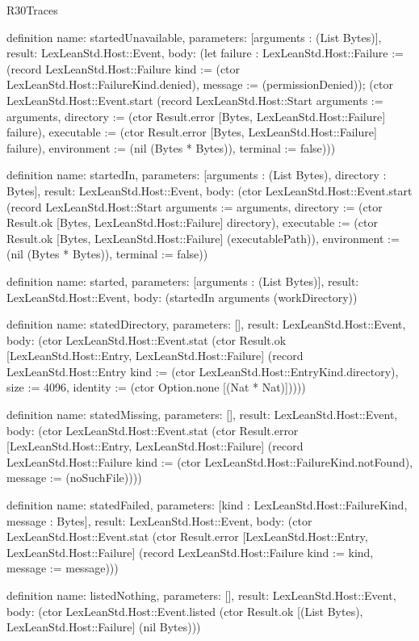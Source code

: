 \begin{lexlean}{R30Traces}
\begin{semanticmodule}
definition{
  name: startedUnavailable,
  parameters: [arguments : (List Bytes)],
  result: LexLeanStd.Host::Event,
  body: (let failure : LexLeanStd.Host::Failure := (record LexLeanStd.Host::Failure {kind := (ctor LexLeanStd.Host::FailureKind.denied), message := (permissionDenied)}); (ctor LexLeanStd.Host::Event.start (record LexLeanStd.Host::Start {arguments := arguments, directory := (ctor Result.error [Bytes, LexLeanStd.Host::Failure] failure), executable := (ctor Result.error [Bytes, LexLeanStd.Host::Failure] failure), environment := (nil (Bytes * Bytes)), terminal := false})))
}

definition{
  name: startedIn,
  parameters: [arguments : (List Bytes), directory : Bytes],
  result: LexLeanStd.Host::Event,
  body: (ctor LexLeanStd.Host::Event.start (record LexLeanStd.Host::Start {arguments := arguments, directory := (ctor Result.ok [Bytes, LexLeanStd.Host::Failure] directory), executable := (ctor Result.ok [Bytes, LexLeanStd.Host::Failure] (executablePath)), environment := (nil (Bytes * Bytes)), terminal := false}))
}

definition{
  name: started,
  parameters: [arguments : (List Bytes)],
  result: LexLeanStd.Host::Event,
  body: (startedIn arguments (workDirectory))
}

definition{
  name: statedDirectory,
  parameters: [],
  result: LexLeanStd.Host::Event,
  body: (ctor LexLeanStd.Host::Event.stat (ctor Result.ok [LexLeanStd.Host::Entry, LexLeanStd.Host::Failure] (record LexLeanStd.Host::Entry {kind := (ctor LexLeanStd.Host::EntryKind.directory), size := 4096, identity := (ctor Option.none [(Nat * Nat)])})))
}

definition{
  name: statedMissing,
  parameters: [],
  result: LexLeanStd.Host::Event,
  body: (ctor LexLeanStd.Host::Event.stat (ctor Result.error [LexLeanStd.Host::Entry, LexLeanStd.Host::Failure] (record LexLeanStd.Host::Failure {kind := (ctor LexLeanStd.Host::FailureKind.notFound), message := (noSuchFile)})))
}

definition{
  name: statedFailed,
  parameters: [kind : LexLeanStd.Host::FailureKind, message : Bytes],
  result: LexLeanStd.Host::Event,
  body: (ctor LexLeanStd.Host::Event.stat (ctor Result.error [LexLeanStd.Host::Entry, LexLeanStd.Host::Failure] (record LexLeanStd.Host::Failure {kind := kind, message := message})))
}

definition{
  name: listedNothing,
  parameters: [],
  result: LexLeanStd.Host::Event,
  body: (ctor LexLeanStd.Host::Event.listed (ctor Result.ok [(List Bytes), LexLeanStd.Host::Failure] (nil Bytes)))
}


\end{semanticmodule}
\end{lexlean}
